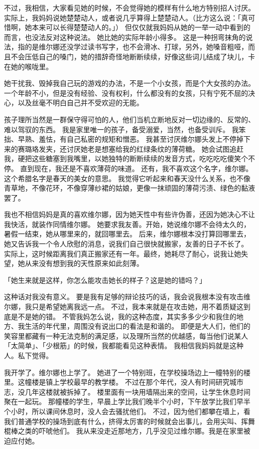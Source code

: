 \documentclass[UTF8]{ctexart}
\begin{document}
不过，我相信，大家看见她的时候，不会觉得她的模样有什么地方特别招人讨厌。
实际上，我妈妈说她楚楚动人，或者说几乎算得上楚楚动人。（比方这么说：「真可惜啊，她本来可以长得楚楚动人的。」）
但仅仅就我妈妈从她的一举一动中看到的而言，也没法反对这种说法。
她比她的实际年龄小得多。
这是一种拐弯抹角的说法，指的是维尔娜还没学过读书写字，也不会滑冰、打球，另外，她嗓音粗哑，而且不会压低自己的嗓门，她的措辞奇怪地断断续续，好像这些词儿结成了块儿，卡在她的喉咙里。

她干扰我、毁掉我自己玩的游戏的办法，不是一个小女孩，而是个大女孩的办法。
一个年龄不小，但是没有经验、没有权利，什么都没有的女孩，只有宁死不屈的决心，以及丝毫不明白自己并不受欢迎的无能。

孩子理所当然是一群保守得可怕的人，他们当机立断地反对一切边缘的、反常的、难以驾驭的东西。
我是家里唯一的孩子，备受溺爱，当然，也备受训斥。
我笨拙、早熟、羞怯，有自己私密的规矩和憎恶。
我甚至讨厌维尔娜头发上不停掉下来的赛璐珞发夹，还讨厌她老是想塞给我的红绿条纹的薄荷糖。
她会试图追赶我，硬把这些糖塞到我嘴里，以她独特的断断续续的发音方式，吃吃吃吃傻笑个不停。
直到现在，我还是不喜欢薄荷的味道。
还有，我不喜欢这个名字，维尔娜。这个希腊名字是春天的美女的意思。
我觉得它听起来和春天没什么关系，也不像青草地，不像花环，不像穿薄纱裙的姑娘，更像一抹顽固的薄荷污渍、绿色的黏液罢了。

我也不相信妈妈是真的喜欢维尔娜，因为她天性中有些许伪善，还因为她决心不让我快活，就装作同情维尔娜。
她要求我友善。开始，她说维尔娜不会待太久的，暑假一结束，她从哪里来的，就回哪里去。
后来，维尔娜根本没打算回哪里去，她又告诉我一个令人欣慰的消息，说我们自己很快就搬家，友善的日子不长了。
实际上，这时候距离我们真正搬家还有一年。最终，她耗尽了耐心，说我让她失望，她从来没有想到我的天性原来如此刻薄。

「她生来就是这样，你怎么能攻击她长的样子？这是她的错吗？」

这种话对我没有意义。
要是我有足够的辩论技巧的话，我会说我根本没有攻击维尔娜，我只是希望她离我远一点。
不过，我本来就是在攻击她，用不着质疑这到底是不是她的错。
不管我妈怎么说，我的这种态度，其实多多少少和我住的地方、我生活的年代里，周围没有说出口的看法是和谐的。
即便是大人们，他们的笑容里都藏有一种无法克制的满足感，以及理所当然的优越感，每当他们说某人「太简单」、「少根筋」的时候，我都能看见这种表情。
我相信我妈妈就是这种人。私下觉得。

我开学了。维尔娜也上学了。
她进了一个特别班，在学校操场边上一幢特别的楼里。这幢楼是镇上学校最早的教学楼。
不过在那个年代，没人有时间研究城市志，没几年这楼就被拆掉了。
楼里面有一块用墙隔出来的空间，让学生休息时间聚在一起玩。
那幢楼的学生，早晨上学比我们晚半个小时，下午放学比我们早半个小时，所以课间休息时，没人会去骚扰他们。
不过，因为他们都攀在墙上，看我们普通学校的操场到底有什么，挤得太厉害的时候就会出事儿，会用尖叫、挥舞棍棒之类的吓唬他们。
我从来没走近那地方，几乎没见过维尔娜。我是在家里被迫应付她。
\end{document}
